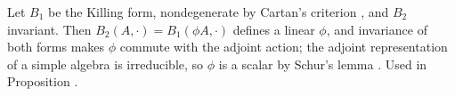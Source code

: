 Let $B_{1}$ be the Killing form, nondegenerate by Cartan's criterion \cite[\S5.1]{Humphreys1972}, and $B_{2}$ invariant. Then $B_{2}(A, \cdot) = B_{1}(\phi A, \cdot)$ defines a linear $\phi$, and invariance of both forms makes $\phi$ commute with the adjoint action; the adjoint representation of a simple algebra is irreducible, so $\phi$ is a scalar by Schur's lemma \cite[\S6.1]{Humphreys1972}. Used in Proposition .
